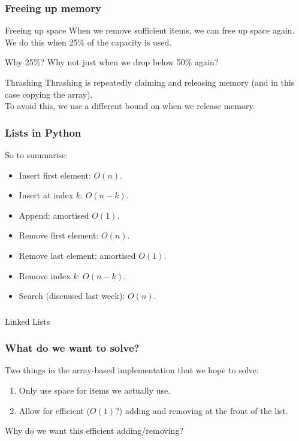 \begin{frame}
	\frametitle{Freeing up memory}
	\begin{block}{Freeing up space}
		When we remove sufficient items, we can free up space again.\\
		We do this when 25\% of the capacity is used.
	\end{block}	
	
	\begin{block}{Why 25\%?}
		Why not just when we drop below 50\% again?
	\end{block}
	
	\begin{block}{Thrashing}
		Thrashing is repeatedly claiming and releasing memory (and in this case copying the array).\\
		To avoid this, we use a different bound on when we release memory.
	\end{block}
\end{frame}

\begin{frame}
	\frametitle{Lists in Python}
	So to summarise:
	\begin{itemize}
		\item Insert first element: $O(n)$.
		\item Insert at index $k$: $O(n-k)$.
		\item Append: amortised $O(1)$.
		\item Remove first element: $O(n)$.
		\item Remove last element: amortised $O(1)$.
		\item Remove index $k$: $O(n-k)$.
		\item Search (discussed last week): $O(n)$.
	\end{itemize}
\end{frame}

\begin{frame}[fragile]\frametitle{}
\begin{center}
{\Large Linked Lists}
\end{center}

\end{frame}

\begin{frame}
	\frametitle{What do we want to solve?}
	
		Two things in the array-based implementation that we hope to solve:
		\begin{enumerate}
			\item Only use space for items we actually use.
			\item Allow for efficient ($O(1)$?) adding and removing at the front of the list.
		\end{enumerate}
	
		Why do we want this efficient adding/removing?
\end{frame}

